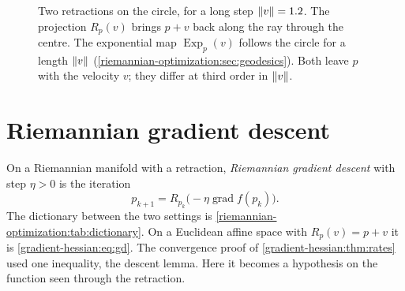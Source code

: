 \begin{notechapter}
\begin{figure}[ht]
\centering
{}
\caption{Two retractions on the circle, for a long step $\left\|v\right\| = 1.2$.
The projection $R_p(v)$ brings $p + v$ back along the ray through the
centre. The exponential map $\operatorname{Exp}_p(v)$ follows the circle
for a length $\left\|v\right\|$ (\cref{riemannian-optimization:sec:geodesics}).
Both leave $p$ with the velocity $v$; they differ at third order in
$\left\|v\right\|$.}
\label{riemannian-optimization:fig:retraction}
\end{figure}

\section{Riemannian gradient descent}\label{riemannian-optimization:sec:rgd}

On a Riemannian manifold with a retraction, \emph{Riemannian gradient
descent} with step $\eta > 0$ is the iteration
\begin{equation}\label{riemannian-optimization:eq:rgd}
  p_{k+1} = R_{p_k}\bigl(-\eta\operatorname{grad}f(p_k)\bigr) .
\end{equation}
The dictionary between the two settings is
\cref{riemannian-optimization:tab:dictionary}.
On a Euclidean affine space with $R_p(v) = p + v$ it is
\eqref{gradient-hessian:eq:gd}. The convergence proof of
\cref{gradient-hessian:thm:rates} used one inequality, the descent lemma.
Here it becomes a hypothesis on the function seen through the retraction.


\end{notechapter}
